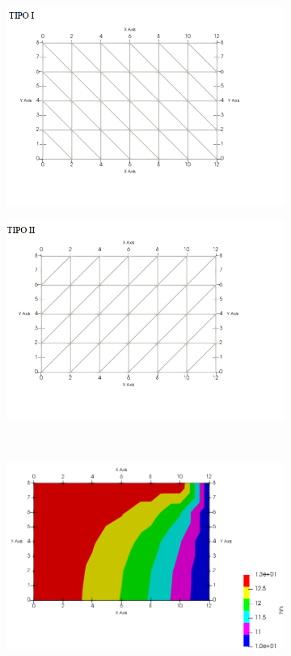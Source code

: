 \documentclass{article} %
\begin{document}
\begin{figure}[H]
	\centering
	\begin{subfigure}[b]{0.43\textwidth}
		\includegraphics[width=\textwidth]{case3am}
		\label{}
	\end{subfigure}
	\begin{subfigure}[b]{0.46\textwidth}
		\includegraphics[width=\textwidth]{case3bm}
		
		\label{}
	\end{subfigure}\\
	\begin{subfigure}[b]{0.49\textwidth}
		\includegraphics[width=\textwidth]{case3ah}
		

\end{subfigure}
\end{figure}
\end{document}
